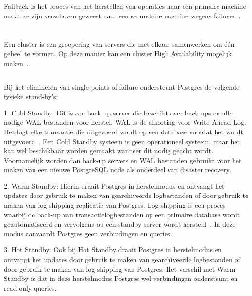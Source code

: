 Failback is het proces van het herstellen van operaties naar een primaire machine  nadat ze zijn verschoven geweest naar een secundaire machine wegens failover~\autocite{TechTarget2020}.


\section{}
\label{sec:Cluster solutions}

\subsection{}
\label{subsec:Cluster}

Een cluster is een groepering van servers die met elkaar samenwerken om één geheel te vormen. Op deze manier kan een cluster High Availability mogelijk maken~\autocite{TechTarget2017}.

\subsection{}
\label{subsec:Standby mogelijkheden}
Bij het elimineren van single points of failure ondersteunt Postgres de volgende fysieke stand-by's:

1. Cold Standby: Dit is een back-up server die beschikt over back-ups en alle nodige WAL-bestanden voor herstel. WAL is de afkorting voor Write Ahead Log. Het logt elke transactie die uitgevoerd wordt op een database voordat het wordt uitgevoerd~\autocite{PostgreSQL2021d}. Een Cold Standby systeem is geen operationeel systeem, maar het kan wel beschikbaar worden gemaakt wanneer dit nodig geacht wordt. Voornamelijk worden dan back-up servers en WAL bestanden gebruikt voor het maken van een nieuwe PostgreSQL node als onderdeel van disaster recovery.

2. Warm Standby: Hierin draait Postgres in herstelmodus en ontvangt het updates door gebruik te maken van gearchiveerde logbestanden of door gebruik te maken van log shipping replicatie van Postgres. Log shipping is een proces waarbij de back-up van transactielogbestanden op een primaire database wordt geautomatiseerd en vervolgens op een standby server wordt hersteld~\autocite{Miller2016}. In deze modus aanvaardt Postgres geen verbindingen en queries.

3. Hot Standby: Ook bij Hot Standby draait Postgres in herstelmodus en ontvangt het updates door gebruik te maken van gearchiveerde logbestanden of door gebruik te maken van log shipping van Postgres. Het verschil met Warm Standby is dat in deze herstelmodus Postgres wel verbindingen ondersteunt en read-only queries.

